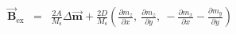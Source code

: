 \documentclass[12pt]{article}
\newcommand{\vc}[1]{\ensuremath{\vec{\textbf{#1}}}}
\newcommand{\m}{\vc{m}}
\newcommand{\Ms}{M_\mathrm{s}}
\newcommand{\B}[1]{\vc{B}_\mathrm{#1}}
\begin{document}
\pagestyle{empty}

\begin{eqnarray*}
	\B{ex} &=& \frac{2 A}{\Ms} \Delta \m + \frac{2D}{\Ms} \left(\frac{\partial m_z}{\partial x},\ \frac{\partial m_z}{\partial y},\ -\frac{\partial m_x}{\partial x}-\frac{\partial m_y}{\partial y}\right) \\
\end{eqnarray*}
\end{document}
